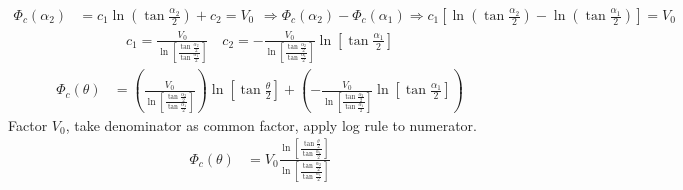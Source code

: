 \documentclass{article}
\begin{document}
{\begin{equation*}
\begin{aligned}
				\Phi_c(\alpha_2) &= c_1 \ln(\tan \tfrac{\alpha_2}{2}) + c_2 = V_0
			\end{aligned}
			\Rightarrow \Phi_c(\alpha_2) - \Phi_c(\alpha_1) \Rightarrow
			c_1 \left[ \ln(\tan \tfrac{\alpha_2}{2}) - \ln(\tan \tfrac{\alpha_1}{2}) \right] = V_0
		\end{equation*}
		\begin{equation*}
			\begin{split}
				c_1 = \frac{V_0}{\ln\left[ \frac{\tan \tfrac{\alpha_2}{2}}{\tan \tfrac{\alpha_1}{2}} \right]} \quad
				c_2 = -\frac{V_0}{\ln\left[ \frac{\tan \tfrac{\alpha_2}{2}}{\tan \tfrac{\alpha_1}{2}} \right]} \ln\left[ \tan \tfrac{\alpha_1}{2} \right]
			\end{split}
		\end{equation*}
		\begin{equation*}
			\begin{split}
				\Phi_c(\theta) &= \left( \frac{V_0}{\ln\left[ \frac{\tan \tfrac{\alpha_2}{2}}{\tan \tfrac{\alpha_1}{2}} \right]} \right) \ln\left[ \tan \tfrac{\theta}{2} \right] + \left( -\frac{V_0}{\ln\left[ \frac{\tan \tfrac{\alpha_2}{2}}{\tan \tfrac{\alpha_1}{2}} \right]} \ln\left[ \tan \tfrac{\alpha_1}{2} \right] \right)
			\end{split}
		\end{equation*}
		Factor $V_0$, take denominator as common factor, apply log rule to numerator.
		\begin{equation*}
			\begin{split}
				\Phi_c(\theta) &= V_0 \frac{ \ln \left[ \frac{\tan \tfrac{\theta}{2}} {\tan \tfrac{\alpha_1}{2}} \right] }{ \ln \left[ \frac{\tan \tfrac{\alpha_2}{2}} {\tan \tfrac{\alpha_1}{2}} \right] }
			\end{split}
		\end{equation*}
	
}
\end{document}
